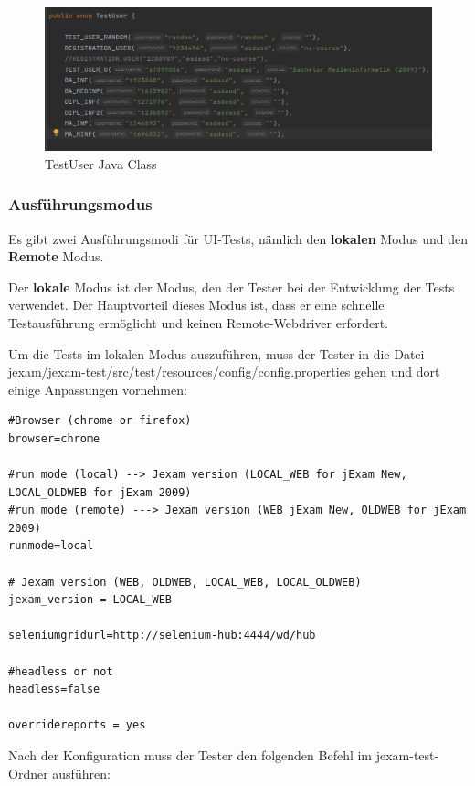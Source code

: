 \begin{figure}[H]
    \centering
    \includegraphics[scale=0.5]{images/test-data}
    \caption{TestUser Java Class}\label{fig:testUser}
\end{figure}


\subsubsection{Ausführungsmodus}

Es gibt zwei Ausführungsmodi für UI-Tests, nämlich
den \textbf{lokalen} Modus und den \textbf{Remote}
Modus.

Der \textbf{lokale} Modus ist der Modus, den der
Tester bei der Entwicklung der Tests verwendet.
Der Hauptvorteil dieses Modus ist, dass er
eine schnelle Testausführung ermöglicht und
keinen Remote-Webdriver erfordert.

Um die Tests im lokalen Modus auszuführen, muss der
Tester in die Datei
jexam/jexam-test/src/test/resources/config/config.properties
gehen und dort einige Anpassungen vornehmen:

\begin{lstlisting}[caption={config.properties}]
#Browser (chrome or firefox)
browser=chrome

#run mode (local) --> Jexam version (LOCAL_WEB for jExam New, LOCAL_OLDWEB for jExam 2009)
#run mode (remote) ---> Jexam version (WEB jExam New, OLDWEB for jExam 2009)
runmode=local

# Jexam version (WEB, OLDWEB, LOCAL_WEB, LOCAL_OLDWEB)
jexam_version = LOCAL_WEB

seleniumgridurl=http://selenium-hub:4444/wd/hub

#headless or not
headless=false

overridereports = yes

\end{lstlisting}

Nach der Konfiguration muss der Tester den folgenden
Befehl im jexam-test-Ordner ausführen:

